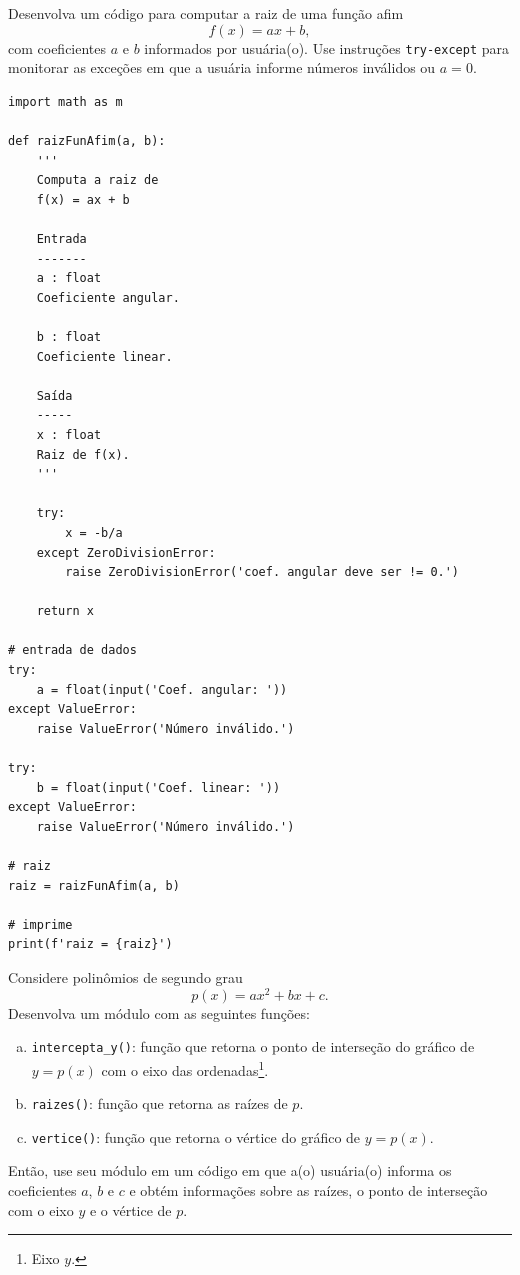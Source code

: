 \begin{exer}
  Desenvolva um código para computar a raiz de uma função afim
  \begin{equation}
    f(x) = ax + b,
  \end{equation}
  com coeficientes $a$ e $b$ informados por usuária(o). Use instruções \lstinline+try-except+ para monitorar as exceções em que a usuária informe números inválidos ou $a=0$.
\end{exer}
\begin{resp}
\begin{lstlisting}
import math as m

def raizFunAfim(a, b):
    '''
    Computa a raiz de
    f(x) = ax + b

    Entrada
    -------
    a : float
    Coeficiente angular.

    b : float
    Coeficiente linear.

    Saída
    -----
    x : float
    Raiz de f(x).
    '''
    
    try:
        x = -b/a
    except ZeroDivisionError:
        raise ZeroDivisionError('coef. angular deve ser != 0.')

    return x

# entrada de dados
try:
    a = float(input('Coef. angular: '))
except ValueError:
    raise ValueError('Número inválido.')

try:
    b = float(input('Coef. linear: '))
except ValueError:
    raise ValueError('Número inválido.')

# raiz
raiz = raizFunAfim(a, b)

# imprime
print(f'raiz = {raiz}')
\end{lstlisting}
\end{resp}

\begin{exer}
  Considere polinômios de segundo grau
  \begin{equation}
    p(x) = ax^2 + bx + c.
  \end{equation}
  Desenvolva um módulo com as seguintes funções:
  \begin{enumerate}[a)]
  \item \lstinline+intercepta_y()+: função que retorna o ponto de interseção do gráfico de $y = p(x)$ com o eixo das ordenadas\footnote{Eixo $y$.}.
  \item \lstinline+raizes()+: função que retorna as raízes de $p$.
  \item \lstinline+vertice()+: função que retorna o vértice do gráfico de $y=p(x)$.
  \end{enumerate}
  Então, use seu módulo em um código em que a(o) usuária(o) informa os coeficientes $a$, $b$ e $c$ e obtém informações sobre as raízes, o ponto de interseção com o eixo $y$ e o vértice de $p$. 
\end{exer}

